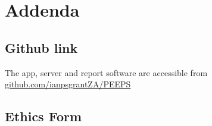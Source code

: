 \chapter{Addenda}

\section{Github link}
The app, server and report software are accessible from \href{https://github.com/ianpsgrantZA/PEEPS}{github.com/ianpsgrantZA/PEEPS}



\section{Ethics Form}


